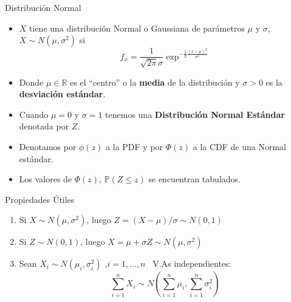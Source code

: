 \documentclass[handout]{beamer}
\begin{document}
\begin{frame}{Distribución Normal}

\scriptsize{
\begin{itemize}
 \item $X$ tiene una distribución Normal o Gaussiana de parámetros  $\mu$ y $\sigma$, $X \sim N(\mu,\sigma^2)$ si
 \begin{displaymath}
 f_x=\frac{1}{\sqrt{2\pi}\sigma}\exp^{-\frac{1}{2}\frac{(x-\mu)^2}{\sigma^{2}}} 
 \end{displaymath}
 \item Donde $\mu \in \mathbb{R}$ es el ``centro'' o la \textbf{media} de la distribución y $\sigma > 0$ es la \textbf{desviación estándar}.
 \item Cuando $\mu = 0$ y $\sigma =1$ tenemos una \textbf{Distribución Normal Estándar} denotada por $Z$.
 \item Denotamos por $\phi(z)$ a la PDF y por $\Phi(z)$ a la CDF de una Normal estándar.
 \item Los valores de  $\Phi(z)$, $\mathbb{P}(Z \leq z)$ se encuentran tabulados.
 \end{itemize}

\begin{block}{Propiedades Útiles}
\begin{enumerate}
 \item Si $X \sim N(\mu, \sigma^2)$, luego $Z=(X-\mu)/\sigma \sim N(0,1)$
 \item Si $Z \sim N(0,1)$, luego $X=\mu+\sigma Z \sim N(\mu, \sigma^2)$
 \item Sean $X_{i} \sim N(\mu_{i},\sigma_{i}^{2})$ ,$i=1,\dots,n$ \ V.As independientes:
 \begin{displaymath}
  \sum_{i=1}^{n}X_{i}\sim N( \sum_{i=1}^{n}\mu_{i}, \sum_{i=1}^{n}\sigma_{i}^{2})
 \end{displaymath}

 
\end{enumerate}
 
\end{block}




}
\end{frame}
\end{document}
